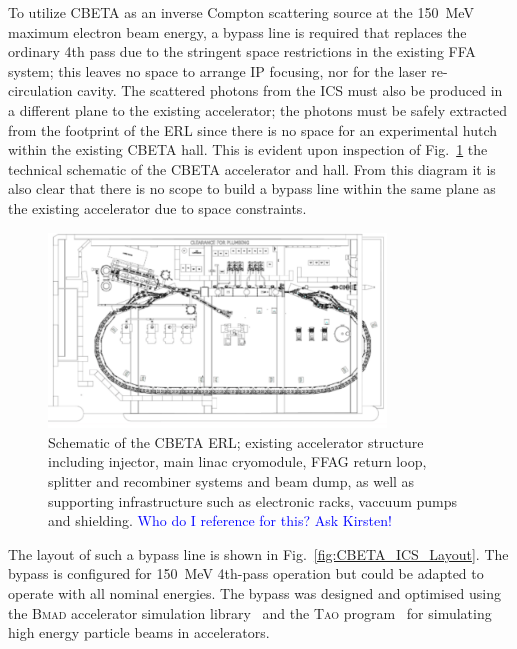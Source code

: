 \documentclass[../main.tex]{subfiles}
\begin{document}
To utilize CBETA as an inverse Compton scattering source at the 150~\si{\mega\electronvolt} maximum electron beam energy, a bypass line is required that replaces the ordinary 4th pass due to the stringent space restrictions in the existing FFA system; this leaves no space to arrange IP focusing, nor for the laser re-circulation cavity. The scattered photons from the ICS must also be produced in a different plane to the existing accelerator; the photons must be safely extracted from the footprint of the ERL since there is no space for an experimental hutch within the existing CBETA hall. This is evident upon inspection of Fig.~\ref{fig:CBETA_schematic} the technical schematic of the CBETA accelerator and hall. From this diagram it is also clear that there is no scope to build a bypass line within the same plane as the existing accelerator due to space constraints.

\begin{figure}[!h]
\centering
\includegraphics[width=0.8\textwidth]{Figures/CBETA_Inverse_Compton_Source_Design/CBETA_schematic.pdf}
\caption{Schematic of the CBETA ERL; existing accelerator structure including injector, main linac cryomodule, FFAG return loop, splitter and recombiner systems and beam dump, as well as supporting infrastructure such as electronic racks, vaccuum pumps and shielding. \textcolor{blue}{Who do I reference for this? Ask Kirsten!}}
\label{fig:CBETA_schematic}
\end{figure}

The layout of such a bypass line is shown in Fig.~\ref{fig:CBETA_ICS_Layout}. The bypass is configured for 150~\si{\mega\electronvolt} 4th-pass operation but could be adapted to operate with all nominal energies. The bypass was designed and optimised using the \textsc{Bmad} accelerator simulation library~\cite{BmadManual} and the \textsc{Tao} program~\cite{TaoManual} for simulating high
energy particle beams in accelerators.
\end{document}
